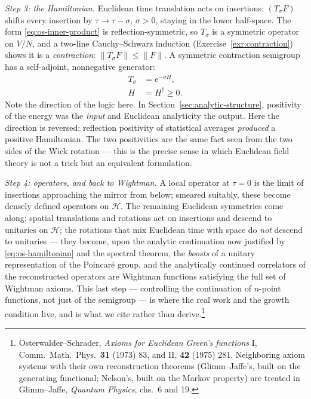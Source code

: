 \emph{Step 3: the Hamiltonian.} Euclidean time translation acts on insertions:
$(T_\sigma F)$ shifts every insertion by $\tau \to \tau - \sigma$, $\sigma > 0$,
staying in the lower half-space. The form \eqref{eq:os-inner-product} is
reflection-symmetric, so $T_\sigma$ is a symmetric operator on $V/N$, and a
two-line Cauchy--Schwarz induction (Exercise~\ref{exr:contraction}) shows it is
a \emph{contraction}: $\|T_\sigma F\| \le \|F\|$. A symmetric contraction
semigroup has a self-adjoint, nonnegative generator:
\begin{equation}
\begin{aligned}
T_\sigma &= e^{-\sigma H},\\
H &= H^\dagger \ge 0 .
\end{aligned}
\label{eq:os-hamiltonian}
\end{equation}
Note the direction of the logic here. In Section~\ref{sec:analytic-structure},
positivity of the energy was the \emph{input} and Euclidean analyticity the
output. Here the direction is reversed: reflection positivity of statistical
averages \emph{produced} a positive Hamiltonian. The two positivities are the
same fact seen from the two sides of the Wick rotation --- this is the precise
sense in which Euclidean field theory is not a trick but an equivalent
formulation.

\emph{Step 4: operators, and back to Wightman.} A local operator at $\tau = 0$
is the limit of insertions approaching the mirror from below; smeared
suitably, these become densely defined operators on $\mathcal{H}$. The
remaining Euclidean symmetries come along: spatial translations and rotations
act on insertions and descend to unitaries on $\mathcal{H}$; the rotations that
mix Euclidean time with space do \emph{not} descend to unitaries --- they
become, upon the analytic continuation now justified by
\eqref{eq:os-hamiltonian} and the spectral theorem, the \emph{boosts} of a
unitary representation of the Poincar\'e group, and the analytically continued
correlators of the reconstructed operators are Wightman functions satisfying
the full set of Wightman axioms. This last step --- controlling the
continuation of $n$-point functions, not just of the semigroup --- is where the
real work and the growth condition live, and is what we cite rather than
derive.\footnote{Osterwalder--Schrader, \emph{Axioms for Euclidean Green's
functions} I, Comm.\ Math.\ Phys.\ \textbf{31} (1973) 83, and II, \textbf{42}
(1975) 281. Neighboring axiom systems with their own reconstruction theorems
(Glimm--Jaffe's, built on the generating functional; Nelson's, built on the
Markov property) are treated in Glimm--Jaffe, \emph{Quantum Physics},
chs.\ 6 and 19.}

